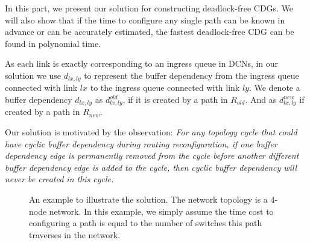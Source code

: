 In this part, we present our solution for constructing deadlock-free CDGs. We will also show that if the time to configure any single path can be known in advance or can be accurately estimated, the fastest deadlock-free CDG can be found in polynomial time.

As each link is exactly corresponding to an ingress queue in DCNs, in our solution we use $d_{lx,ly}$ to represent the buffer dependency from the ingress queue connected with link $lx$ to the ingress queue connected with link $ly$. We denote a buffer dependency $d_{lx,ly}$ as $d^{old}_{lx,ly}$, if it is created by a path in $R_{old}$. And as $d^{new}_{lx,ly}$ if created by a path in $R_{new}$.

Our solution is motivated by the observation: \textit{For any topology cycle that could have cyclic buffer dependency during routing reconfiguration, if one buffer dependency edge is permanently removed from the cycle before another different buffer dependency edge is added to the cycle, then cyclic buffer dependency will never be created in this cycle.} 


\begin{figure}[t]
	\centering
	
	
	
	\caption{An example to illustrate the solution. The network topology is a 4-node network. In this example, we simply assume the time cost to configuring a path is equal to the number of switches this path traverses in the network.}\label{fig:solution_example}
	
\end{figure}

